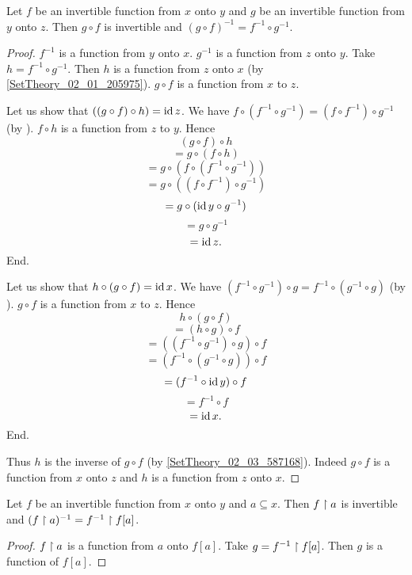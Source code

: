 \documentclass[../../set-theory.ftl.tex]{subfiles}
\begin{document}
\begin{forthel}
    \begin{proposition}\label{SetTheory_02_03_430030}
      Let $f$ be an invertible function from $x$ onto $y$ and $g$ be an invertible function from $y$ onto $z$.
      Then $g \circ f$ is invertible and $(g \circ f)^{-1} = f^{-1} \circ g^{-1}$.
    \end{proposition}
    \begin{proof}
      $f^{-1}$ is a function from $y$ onto $x$.
      $g^{-1}$ is a function from $z$ onto $y$.
      Take $h = f^{-1} \circ g^{-1}$.
      Then $h$ is a function from $z$ onto $x$ (by \ref{SetTheory_02_01_205975}).
      $g \circ f$ is a function from $x$ to $z$.

      Let us show that $((g \circ f) \circ h) = \operatorname{id}{z}$.
        We have $f \circ (f^{-1} \circ g^{-1}) = (f \circ f^{-1}) \circ g^{-1}$ (by ).
        $f \circ h$ is a function from $z$ to $y$.
        Hence
        \[   (g \circ f) \circ h \]
        \[ = g \circ (f \circ h) \]
        \[ = g \circ (f \circ (f^{-1} \circ g^{-1})) \]
        \[ = g \circ ((f \circ f^{-1}) \circ g^{-1}) \]
        \[ = g \circ (\operatorname{id}{y} \circ g^{-1}) \]
        \[ = g \circ g^{-1} \]
        \[ = \operatorname{id}{z}. \]
      End.

      Let us show that $h \circ (g \circ f) = \operatorname{id}{x}$.
        We have $(f^{-1} \circ g^{-1}) \circ g = f^{-1} \circ (g^{-1} \circ g)$ (by ).
        $g \circ f$ is a function from $x$ to $z$.
        Hence
        \[   h \circ (g \circ f) \]
        \[ = (h \circ g) \circ f \]
        \[ = ((f^{-1} \circ g^{-1}) \circ g) \circ f \]
        \[ = (f^{-1} \circ (g^{-1} \circ g)) \circ f \]
        \[ = (f^{-1} \circ \operatorname{id}{y}) \circ f \]
        \[ = f^{-1} \circ f \]
        \[ = \operatorname{id}{x}. \]
      End.

      Thus $h$ is the inverse of $g \circ f$ (by \ref{SetTheory_02_03_587168}).
      Indeed $g \circ f$ is a function from $x$ onto $z$ and $h$ is a function from $z$ onto $x$.
    \end{proof}

    \begin{proposition}\label{SetTheory_02_03_908585}
      Let $f$ be an invertible function from $x$ onto $y$ and $a \subseteq x$.
      Then $f \upharpoonright a$ is invertible and $(f\upharpoonright a)^{-1} = f^{-1} \upharpoonright f[a]$.
    \end{proposition}
    \begin{proof}
      $f \upharpoonright a$ is a function from $a$ onto $f[a]$.
      Take $g = f^{-1} \upharpoonright f[a]$.
      Then $g$ is a function of $f[a]$.


\end{proof}
\end{forthel}
\end{document}
